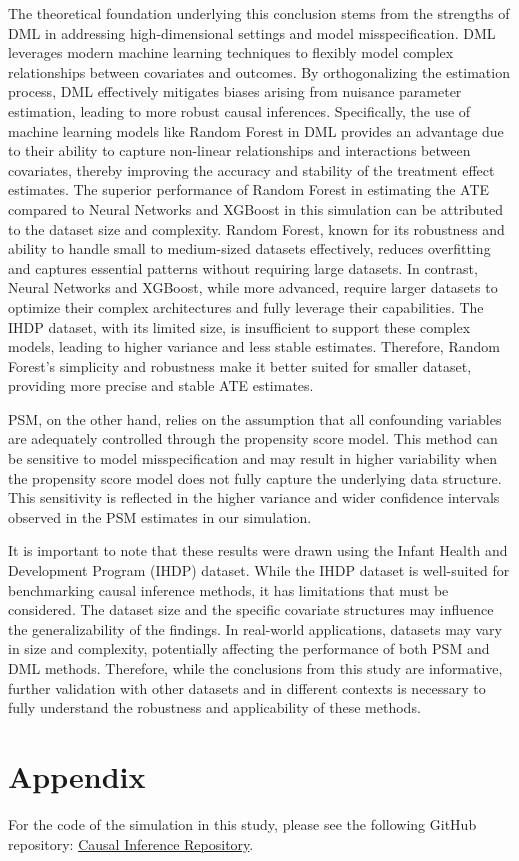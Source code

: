 \documentclass{article}
\begin{document}
The theoretical foundation underlying this conclusion stems from the strengths of DML in addressing high-dimensional settings and model misspecification. DML leverages modern machine learning techniques to flexibly model complex relationships between covariates and outcomes. By orthogonalizing the estimation process, DML effectively mitigates biases arising from nuisance parameter estimation, leading to more robust causal inferences. Specifically, the use of machine learning models like Random Forest in DML provides an advantage due to their ability to capture non-linear relationships and interactions between covariates, thereby improving the accuracy and stability of the treatment effect estimates. The superior performance of Random Forest in estimating the ATE compared to Neural Networks and XGBoost in this simulation can be attributed to the dataset size and complexity. Random Forest, known for its robustness and ability to handle small to medium-sized datasets effectively, reduces overfitting and captures essential patterns without requiring large datasets. In contrast, Neural Networks and XGBoost, while more advanced, require larger datasets to optimize their complex architectures and fully leverage their capabilities. The IHDP dataset, with its limited size, is insufficient to support these complex models, leading to higher variance and less stable estimates. Therefore, Random Forest's simplicity and robustness make it better suited for smaller dataset, providing more precise and stable ATE estimates.

PSM, on the other hand, relies on the assumption that all confounding variables are adequately controlled through the propensity score model. This method can be sensitive to model misspecification and may result in higher variability when the propensity score model does not fully capture the underlying data structure. This sensitivity is reflected in the higher variance and wider confidence intervals observed in the PSM estimates in our simulation.

It is important to note that these results were drawn using the Infant Health and Development Program (IHDP) dataset. While the IHDP dataset is well-suited for benchmarking causal inference methods, it has limitations that must be considered. The dataset size and the specific covariate structures may influence the generalizability of the findings. In real-world applications, datasets may vary in size and complexity, potentially affecting the performance of both PSM and DML methods. Therefore, while the conclusions from this study are informative, further validation with other datasets and in different contexts is necessary to fully understand the robustness and applicability of these methods.

\section{Appendix}

For the code of the simulation in this study, please see the following GitHub repository: \href{https://github.com/Vindmn1234/Causal-Inference.git}{Causal Inference Repository}.


\newpage


\end{document}

